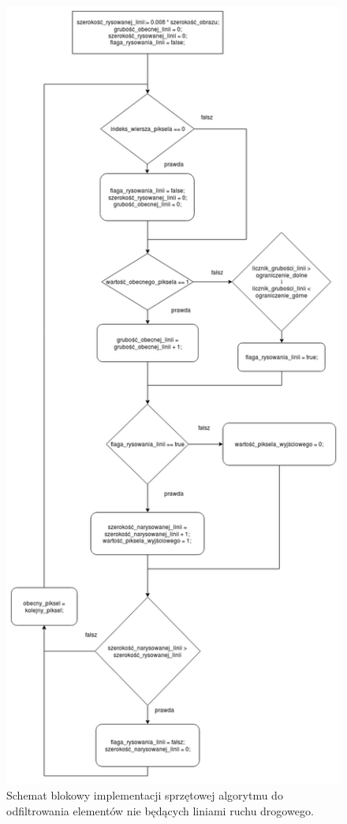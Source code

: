 \begin{figure}[h]
	\centering
	\includegraphics[scale=0.35]{impl_dev_lmps_2.png}
	\caption{Schemat blokowy implementacji sprzętowej algorytmu do odfiltrowania elementów nie będących liniami ruchu drogowego.}
	\label{fig:lmps2}
\end{figure}

